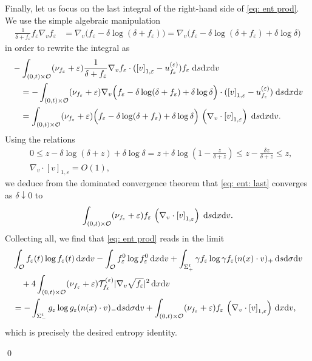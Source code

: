 \documentclass[10pt, reqno]{amsart}
\theoremstyle{plain}
\theoremstyle{definition}
\theoremstyle{remark}
\renewenvironment{proof}[1][\proofname]{\noindent{\scshape #1.\quad}}{\qed}
\numberwithin{equation}{section}
\newcommand{\calO}{\mathcal O}
\newcommand{\calT}{\mathcal T}
\newcommand{\ve}{\varepsilon}
\newcommand{\dx}{\textnormal{d}x}
\newcommand{\dv}{\textnormal{d}v}
\newcommand{\ds}{\textnormal{d}s}
\newcommand{\tnd}{\textnormal{d}}
\newcommand{\lt}{\left}
\newcommand{\rt}{\right}
\newcommand{\renorm}[3]{\lt[#1\rt]_{#2 , #3}}
\begin{document}
\begin{proof}
Finally, let us focus on the last integral of the right-hand side of \eqref{eq: ent prod}. We use the simple algebraic manipulation
    \begin{align*}
        \frac{1}{\delta + f_\ve} f_\ve \nabla_v f_\ve  &= \nabla_v \Big( f_\ve - \delta \log (\delta + f_\ve) \Big) = \nabla_v \Big( f_\ve - \delta \log (\delta + f_\ve) + \delta \log \delta \Big)
    \end{align*}
    in order to rewrite the integral as
    \begin{align}
        &-\int_{(0,t)\times \calO} (\nu_{f_\ve} + \ve) \frac{1}{\delta+f_\ve} \nabla_v f_\ve \cdot ( \renorm{v}{1}{\ve} -u_{f_\ve}^{(\ve)} ) f_\ve \;\ds\dx\dv \nonumber \\
        &\quad= -\int_{(0,t)\times\calO} (\nu_{f_\ve} + \ve) \nabla_v \Big( f_\ve - \delta \log (\delta + f_\ve) + \delta \log \delta \Big) \cdot (\renorm{v}{1}{\ve} - u_{f_\ve}^{(\ve)}) \;\ds\dx\dv \nonumber\\
        &\quad= \int_{(0,t)\times \calO} (\nu_{f_\ve} + \ve) \Big( f_\ve - \delta\log(\delta + f_\ve) + \delta \log \delta \Big) \,\lt(\nabla_v\cdot \renorm{v}{1}{\ve}\rt) \;\ds\dx\dv. \label{eq: ent: last}
    \end{align}
    Using the relations
    \begin{align*}
        &0 \le z - \delta \log (\delta + z) + \delta \log \delta = z + \delta \log \lt(1 - \frac{z}{\delta+z}\rt) \le z - \frac{\delta z}{\delta + z} \le z, \\
        &\nabla_v\cdot \renorm{v}{1}{\ve} = O(1),
    \end{align*}
    we deduce from the dominated convergence theorem that \eqref{eq: ent: last} converges as $\delta\downarrow 0$ to
    \begin{align*}
        \int_{(0,t)\times \calO} (\nu_{f_\ve} + \ve) f_\ve \, \lt(\nabla_v\cdot \renorm{v}{1}{\ve}\rt) \;\ds\dx\dv.    
    \end{align*}
    Collecting all, we find that \eqref{eq: ent prod} reads in the limit
    \begin{equation}\label{eq: entropy identity}
    \begin{split}
        &\int_{\calO} f_\ve(t) \log f_\ve(t) \,\dx\dv - \int_{\calO} f_\ve^0 \log f_\ve^0 \,\dx\dv + \int_{\Sigma_+^t} \gamma f_\ve \log \gamma f_\ve (n(x)\cdot v)_+ \,\ds\tnd\sigma\dv\\
        &\quad + 4\int_{(0,t)\times\calO} (\nu_{f_\ve} + \ve) \calT_{f_\ve}^{(\ve)} |\nabla_v \sqrt{f_\ve}|^2 \,\dx\dv \\
        &= -\int_{\Sigma_-^t} g_\ve \log g_\ve (n(x)\cdot v)_- \ds\tnd\sigma\dv + \int_{(0,t)\times \calO} (\nu_{f_\ve} + \ve) f_\ve \, \lt(\nabla_v\cdot \renorm{v}{1}{\ve}\rt)\,\dx\dv,
    \end{split}
    \end{equation}
    which is precisely the desired entropy identity.
    

\end{proof}
\end{document}
